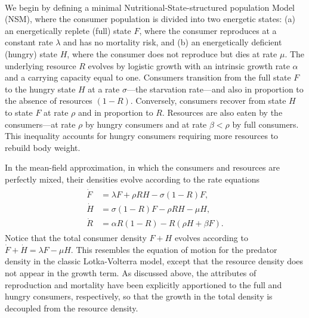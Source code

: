 \documentclass{pnastwo}
\begin{document}
\begin{article}
\\
We begin by defining a minimal Nutritional-State-structured population Model
(NSM), where the consumer population is divided into two energetic states:
(a) an energetically replete (full) state $F$, where the consumer reproduces
at a constant rate $\lambda$ and has no mortality risk, and (b) an
energetically deficient (hungry) state $H$, where the consumer does not
reproduce but dies at rate $\mu$.  The underlying resource $R$ evolves by
logistic growth with an intrinsic growth rate $\alpha$ and a carrying
capacity equal to one.  Consumers transition from the full state $F$ to the
hungry state $H$ at a rate $\sigma$---the starvation rate---and also in
proportion to the absence of resources $(1-R)$.  Conversely, consumers
recover from state $H$ to state $F$ at rate $\rho$ and in proportion to $R$.
Resources are also eaten by the consumers---at rate $\rho$ by hungry
consumers and at rate $\beta<\rho$ by full consumers.  This inequality
accounts for hungry consumers requiring more resources to rebuild body
weight.

In the mean-field approximation, in which the consumers and resources are
perfectly mixed, their densities evolve according to the rate equations
\begin{eqnarray} 
\label{eq:system}
\begin{split}
\dot{F} &= \lambda F + \rho RH - \sigma (1-R)F,  \\
\dot{H} &= \sigma (1-R)F - \rho RH - \mu H,  \\
\dot{R} &= \alpha R(1-R) - R(\rho H+ \beta F).
\end{split}
\end{eqnarray}
Notice that the total consumer density $F+H$ evolves according to
$\dot{F}+\dot{H}=\lambda F-\mu H$.  This resembles the equation of motion for
the predator density in the classic Lotka-Volterra model, except that the
resource density does not appear in the growth term.  As discussed above, the
attributes of reproduction and mortality have been explicitly apportioned to
the full and hungry consumers, respectively, so that the growth in the total
density is decoupled from the resource density.


\end{article}
\end{document}
